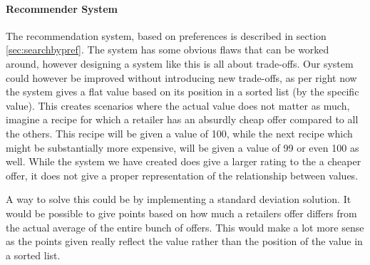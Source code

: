 \paragraph{Recommender System}
\label{para:recommend}

The recommendation system, based on preferences is described in section \ref{sec:searchbypref}. The system has some obvious flaws that can be worked around, however designing a system like this is all about trade-offs. Our system could however be improved without introducing new trade-offs, as per right now the system gives a flat value based on its position in a sorted list (by the specific value). This creates scenarios where the actual value does not matter as much, imagine a recipe for which a retailer has an absurdly cheap offer compared to all the others. This recipe will be given a value of 100, while the next recipe which might be substantially more expensive, will be given a value of 99 or even 100 as well. While the system we have created does give a larger rating to the a cheaper offer, it does not give a proper representation of the relationship between values.

A way to solve this could be by implementing a standard deviation solution. It would be possible to give points based on how much a retailers offer differs from the actual average of the entire bunch of offers. This would make a lot more sense as the points given really reflect the value rather than the position of the value in a sorted list.
